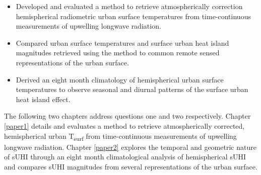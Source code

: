 \begin{bibunit}
\begin{itemize}
	\item Developed and evaluated a method to retrieve atmospherically correction hemispherical radiometric urban surface temperatures from time-continuous measurements of upwelling longwave radiation.
	\item Compared urban surface temperatures and surface urban heat island magnitudes retrieved using the method to common remote sensed representations of the urban surface.
	\item Derived an eight month climatology of hemispherical urban surface temperatures to observe seasonal and diurnal patterns of the surface urban heat island effect.
\end{itemize}

The following two chapters address questions one and two respectively. Chapter \ref{paper1} details and evaluates a method to retrieve atmospherically corrected, hemispherical urban T\textsubscript{surf} from time-continuous measurements of upwelling longwave radiation. Chapter \ref{paper2} explores the temporal and geometric nature of sUHI through an eight month climatological analysis of hemispherical sUHI and compares sUHI magnitudes from several representations of the urban surface.


\cleardoublepage 
{}  
\renewcommand*{\bibname}{References}

\putbib
\end{bibunit}